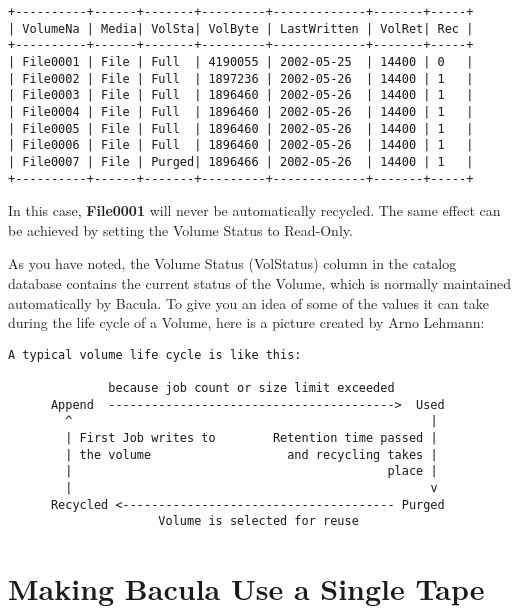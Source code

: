 \footnotesize
\begin{verbatim}
+----------+------+-------+---------+-------------+-------+-----+
| VolumeNa | Media| VolSta| VolByte | LastWritten | VolRet| Rec |
+----------+------+-------+---------+-------------+-------+-----+
| File0001 | File | Full  | 4190055 | 2002-05-25  | 14400 | 0   |
| File0002 | File | Full  | 1897236 | 2002-05-26  | 14400 | 1   |
| File0003 | File | Full  | 1896460 | 2002-05-26  | 14400 | 1   |
| File0004 | File | Full  | 1896460 | 2002-05-26  | 14400 | 1   |
| File0005 | File | Full  | 1896460 | 2002-05-26  | 14400 | 1   |
| File0006 | File | Full  | 1896460 | 2002-05-26  | 14400 | 1   |
| File0007 | File | Purged| 1896466 | 2002-05-26  | 14400 | 1   |
+----------+------+-------+---------+-------------+-------+-----+
\end{verbatim}
\normalsize

In this case, {\bf File0001} will never be automatically recycled. The same
effect can be achieved by setting the Volume Status to Read-Only. 

As you have noted, the Volume Status (VolStatus) column in the 
catalog database contains the current status of the Volume, which
is normally maintained automatically by Bacula. To give you an
idea of some of the values it can take during the life cycle of
a Volume, here is a picture created by Arno Lehmann:

\footnotesize
\begin{verbatim}
A typical volume life cycle is like this:

              because job count or size limit exceeded
      Append  ---------------------------------------->  Used
        ^                                                  |
        | First Job writes to        Retention time passed |
        | the volume                   and recycling takes |
        |                                            place |
        |                                                  v
      Recycled <-------------------------------------- Purged
                     Volume is selected for reuse

\end{verbatim}
\normalsize


\section{Making Bacula Use a Single Tape}
\label{singletape}

